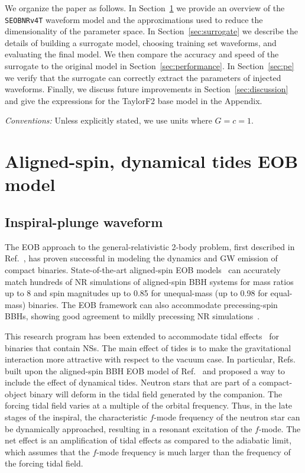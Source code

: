 \documentclass[prd,aps,letter,twocolumn,floatfix,notitlepage,nofootinbib]{revtex4-1}
\begin{document}
We organize the paper as follows. In Section~\ref{sec:eob} we provide an overview of the \texttt{SEOBNRv4T} waveform model and the approximations used to reduce the dimensionality of the parameter space. In Section~\ref{sec:surrogate} we describe the details of building a surrogate model, choosing training set waveforms, and evaluating the final model. We then compare the accuracy and speed of the surrogate to the original model in Section~\ref{sec:performance}. In Section~\ref{sec:pe} we verify that the surrogate can correctly extract the parameters of injected waveforms. Finally, we discuss future improvements in Section~\ref{sec:discussion} and give the expressions for the TaylorF2 base model in the Appendix.

\textit{Conventions:} Unless explicitly stated, we use units where $G=c=1$.


\section{Aligned-spin, dynamical tides EOB model}
\label{sec:eob}

\subsection{Inspiral-plunge waveform}

The EOB approach to the general-relativistic 2-body problem, first described in Ref.~\cite{Buonanno:1998gg}, has proven successful in modeling the dynamics and GW emission of compact binaries. State-of-the-art aligned-spin EOB models~\cite{Bohe:2016gbl,Nagar:2017jdw} can accurately match hundreds of NR simulations of aligned-spin BBH systems for mass ratios up to 8 and spin magnitudes up to 0.85 for unequal-mass (up to 0.98 for equal-mass) binaries. The EOB framework can also accommodate precessing-spin BBHs, showing good agreement to mildly precessing NR simulations~\cite{Babak:2016tgq}. 

This research program has been extended to accommodate tidal effects~\cite{Damour:2009wj,Vines:2010ca,Damour:2012yf,Bini:2012gu,Bernuzzi:2014owa,Hinderer:2016eia,Steinhoff:2016rfi,Dietrich:2017feu,AkcayBernuzziMessina2018} for binaries that contain NSs. The main effect of tides is to make the gravitational interaction more attractive with respect to the vacuum case. In particular, Refs.~\cite{Hinderer:2016eia,Steinhoff:2016rfi} built upon the aligned-spin BBH EOB model of Ref.~\cite{Taracchini:2013rva} and proposed a way to include the effect of dynamical tides. Neutron stars that are part of a compact-object binary will deform in the tidal field generated by the companion. The forcing tidal field varies at a multiple of the orbital frequency. Thus, in the late stages of the inspiral, the characteristic $f$-mode frequency of the neutron star can be dynamically approached, resulting in a resonant excitation of the $f$-mode. The net effect is an amplification of tidal effects as compared to the adiabatic limit, which assumes that the $f$-mode frequency is much larger than the frequency of the forcing tidal field.
\end{document}
